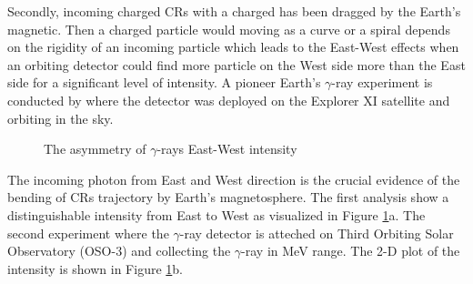 Secondly, incoming charged CRs with a charged has been dragged 
by the Earth's magnetic. Then a charged particle would moving as 
a curve or a spiral depends on the rigidity of an incoming particle
which leads to the East-West effects when an orbiting detector could 
find more particle on the West side more than the East side for 
a significant level of intensity. A pioneer Earth's $\gamma$-ray 
experiment is conducted by \cite{kraushaar1965explorer} where the 
detector was deployed on the Explorer XI satellite and orbiting in the sky.


\begin{figure}[h]
    \centering
        \hfill
        \caption{
            The asymmetry of $\gamma$-rays East-West intensity 
        }
       \label{fig:gamma_ew}
\end{figure}
The incoming photon from East and West direction is the crucial evidence 
of the bending of CRs trajectory by Earth's magnetosphere. The first 
analysis show a distinguishable intensity from East to West as visualized 
in Figure \ref{fig:gamma_ew}a. The second experiment where
the $\gamma$-ray detector is atteched on Third Orbiting Solar
Observatory (OSO-3) and collecting the $\gamma$-ray in MeV range.
The 2-D plot of the intensity is shown in Figure \ref{fig:gamma_ew}b.

